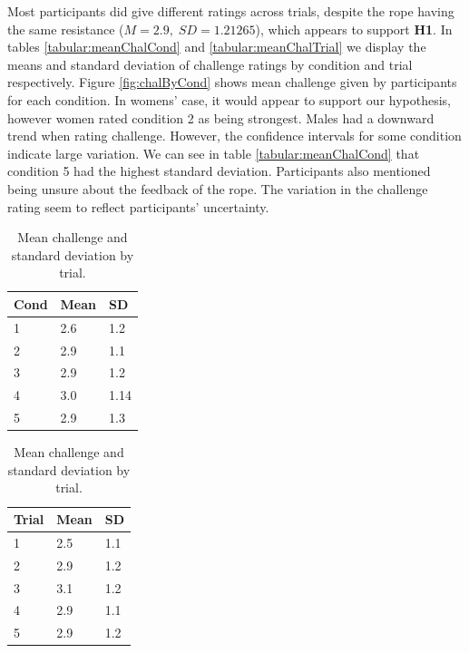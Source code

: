 Most participants did give different ratings across trials, despite the rope having the same resistance ($M=2.9,\; SD=1.21265 $), which appears to support \textbf{H1}. In tables \ref{tabular:meanChalCond} and \ref{tabular:meanChalTrial} we display the means and standard deviation of challenge ratings by condition and trial respectively.
Figure \ref{fig:chalByCond} shows mean challenge given by participants for each condition. In womens' case, it would appear to support our hypothesis, however women rated condition 2 as being strongest. Males had a downward trend when rating challenge. However, the confidence intervals for some condition indicate large variation. We can see in table \ref{tabular:meanChalCond} that condition 5 had the highest standard deviation. Participants also mentioned being unsure about the feedback of the rope. The variation in the challenge rating seem to reflect participants' uncertainty. 

\begin{table}[H]
 \captionsetup{justification=centering,margin=0.1cm}
 \begin{minipage}{.5\linewidth}
     \centering
\begin{tabular}{|lll|}
\hline
Cond & Mean & SD \\
\hline
1 & 2.6 & 1.2\\  
2 &  2.9 & 1.1\\ 
3 &  2.9 & 1.2\\ 
4 &  3.0 & 1.14\\  
5 & 2.9 & 1.3\\  
\hline
\end{tabular}
\caption{Mean challenge and standard deviation by condition.}
\label{tabular:meanChalCond}
\end{minipage}\hfill
 \begin{minipage}{.5\linewidth}
 \centering
\begin{tabular}{|lll|}
\hline
Trial & Mean & SD \\
\hline
1 & 2.5 & 1.1\\  
2 & 2.9 & 1.2\\  
3 & 3.1 &  1.2\\  
4 & 2.9 & 1.1\\  
5 & 2.9 & 1.2\\  
\hline
\end{tabular}
\caption{Mean challenge and standard deviation by trial.}
\label{tabular:meanChalTrial}
\end{minipage}
\label{tbl:meanChalCond1}
\end{table} 

